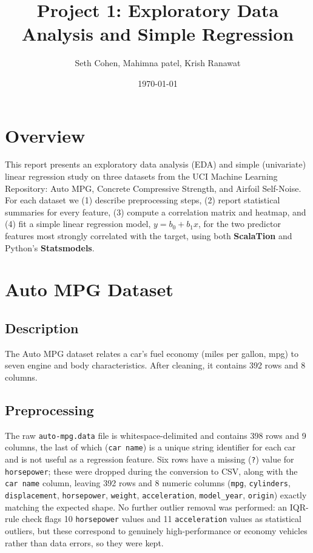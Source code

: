 \documentclass[11pt]{article}
\title{Project 1: Exploratory Data Analysis and Simple Regression}
\author{Seth Cohen, Mahimna patel, Krish Ranawat}
\date{\today}
\begin{document}
\maketitle

\section*{Overview}
This report presents an exploratory data analysis (EDA) and simple (univariate)
linear regression study on three datasets from the UCI Machine Learning
Repository: Auto MPG, Concrete Compressive Strength, and Airfoil Self-Noise.
For each dataset we (1) describe preprocessing steps, (2) report statistical
summaries for every feature, (3) compute a correlation matrix and heatmap,
and (4) fit a simple linear regression model, $y = b_0 + b_1 x$, for the two
predictor features most strongly correlated with the target, using both
\textbf{ScalaTion} and Python's \textbf{Statsmodels}.

\clearpage
\section{Auto MPG Dataset}

\subsection{Description}
The Auto MPG dataset relates a car's fuel economy (miles per gallon, mpg) to
seven engine and body characteristics. After cleaning, it contains 392 rows
and 8 columns.

\subsection{Preprocessing}
The raw \texttt{auto-mpg.data} file is whitespace-delimited and contains 398
rows and 9 columns, the last of which (\texttt{car name}) is a unique string
identifier for each car and is not useful as a regression feature. Six rows
have a missing (\texttt{?}) value for \texttt{horsepower}; these were dropped
during the conversion to CSV, along with the \texttt{car name} column, leaving
392 rows and 8 numeric columns (\texttt{mpg}, \texttt{cylinders},
\texttt{displacement}, \texttt{horsepower}, \texttt{weight},
\texttt{acceleration}, \texttt{model\_year}, \texttt{origin}) exactly matching
the expected shape. No further outlier removal was performed: an IQR-rule
check flags 10 \texttt{horsepower} values and 11 \texttt{acceleration} values
as statistical outliers, but these correspond to genuinely high-performance
or economy vehicles rather than data errors, so they were kept.
\end{document}
